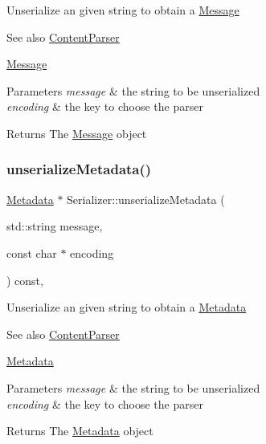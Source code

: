 Unserialize an given string to obtain a \mbox{\hyperlink{classMessage}{Message}} \begin{DoxySeeAlso}{See also}
\mbox{\hyperlink{classContentParser}{Content\+Parser}} 

\mbox{\hyperlink{classMessage}{Message}}
\end{DoxySeeAlso}

\begin{DoxyParams}{Parameters}
{\em message} & the string to be unserialized \\
\hline
{\em encoding} & the key to choose the parser \\
\hline
\end{DoxyParams}
\begin{DoxyReturn}{Returns}
The \mbox{\hyperlink{classMessage}{Message}} object 
\end{DoxyReturn}
\mbox{\label{classSerializer_a64b858f0c2968e888cf796b6f09eed7b}} 
\subsubsection{\texorpdfstring{unserialize\+Metadata()}{unserializeMetadata()}}
{\footnotesize\ttfamily \mbox{\hyperlink{classMetadata}{Metadata}} $\ast$ Serializer\+::unserialize\+Metadata (\begin{DoxyParamCaption}\item[{std\+::string}]{message,  }\item[{const char $\ast$}]{encoding }\end{DoxyParamCaption}) const\hspace{0.3cm}{\ttfamily [virtual]}, {\ttfamily [inherited]}}

Unserialize an given string to obtain a \mbox{\hyperlink{classMetadata}{Metadata}} \begin{DoxySeeAlso}{See also}
\mbox{\hyperlink{classContentParser}{Content\+Parser}} 

\mbox{\hyperlink{classMetadata}{Metadata}}
\end{DoxySeeAlso}

\begin{DoxyParams}{Parameters}
{\em message} & the string to be unserialized \\
\hline
{\em encoding} & the key to choose the parser \\
\hline
\end{DoxyParams}
\begin{DoxyReturn}{Returns}
The \mbox{\hyperlink{classMetadata}{Metadata}} object 
\end{DoxyReturn}
\mbox{\label{classCustomSerializer_abff58f1a955c2f399127b7e3cae23223}} 
